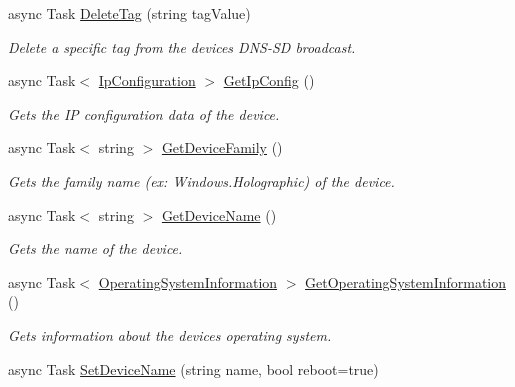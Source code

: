 \begin{DoxyCompactItemize}
async Task \hyperlink{class_microsoft_1_1_tools_1_1_windows_device_portal_1_1_device_portal_aaea50953fe1efac7d8e1dee20932c809}{Delete\+Tag} (string tag\+Value)
\begin{DoxyCompactList}\small\item\em Delete a specific tag from the device\textquotesingle{}s D\+N\+S-\/\+SD broadcast. \end{DoxyCompactList}\item 
async Task$<$ \hyperlink{class_microsoft_1_1_tools_1_1_windows_device_portal_1_1_device_portal_1_1_ip_configuration}{Ip\+Configuration} $>$ \hyperlink{class_microsoft_1_1_tools_1_1_windows_device_portal_1_1_device_portal_a4852d2f65ee080da2f5b1af662ba2a18}{Get\+Ip\+Config} ()
\begin{DoxyCompactList}\small\item\em Gets the IP configuration data of the device. \end{DoxyCompactList}\item 
async Task$<$ string $>$ \hyperlink{class_microsoft_1_1_tools_1_1_windows_device_portal_1_1_device_portal_af758242492965e7e6a323c6522069176}{Get\+Device\+Family} ()
\begin{DoxyCompactList}\small\item\em Gets the family name (ex\+: Windows.\+Holographic) of the device. \end{DoxyCompactList}\item 
async Task$<$ string $>$ \hyperlink{class_microsoft_1_1_tools_1_1_windows_device_portal_1_1_device_portal_a4c27ed62c332e5477e5d2105b2c9acd6}{Get\+Device\+Name} ()
\begin{DoxyCompactList}\small\item\em Gets the name of the device. \end{DoxyCompactList}\item 
async Task$<$ \hyperlink{class_microsoft_1_1_tools_1_1_windows_device_portal_1_1_device_portal_1_1_operating_system_information}{Operating\+System\+Information} $>$ \hyperlink{class_microsoft_1_1_tools_1_1_windows_device_portal_1_1_device_portal_ac2a934be66cb8fa1e0a5e5b782edda81}{Get\+Operating\+System\+Information} ()
\begin{DoxyCompactList}\small\item\em Gets information about the device\textquotesingle{}s operating system. \end{DoxyCompactList}\item 
async Task \hyperlink{class_microsoft_1_1_tools_1_1_windows_device_portal_1_1_device_portal_a566f08b2e203cbfd9425619664e8e651}{Set\+Device\+Name} (string name, bool reboot=true)

\end{DoxyCompactItemize}
